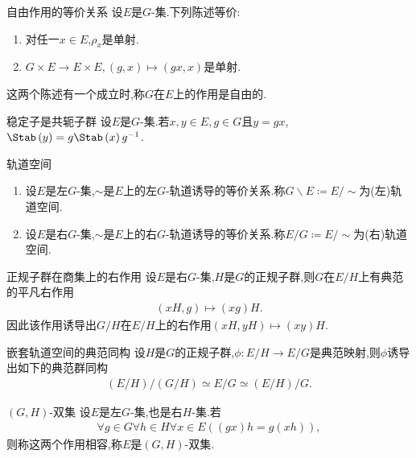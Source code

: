 \begin{proposition}{自由作用的等价关系}{}
	设$E$是$G$-集.下列陈述等价:
	\begin{enumerate}
		\item 对任一$x\in E$,$\rho_{x}$是单射.
		\item $G\times E\to E\times E,\left(g,x\right)\mapsto\left(gx,x\right)$是单射.
	\end{enumerate}
	这两个陈述有一个成立时,称$G$在$E$上的作用是自由的.
\end{proposition}

\begin{proposition}{稳定子是共轭子群}{}
	设$E$是$G$-集.若$x,y\in E,g\in G$且$y=gx$,$\Stab\left(y\right)=g\Stab\left(x\right)g^{-1}$.
\end{proposition}

\begin{definition}{轨道空间}{}
	\begin{enumerate}
		\item 设$E$是左$G$-集,$\sim$是$E$上的左$G$-轨道诱导的等价关系.称$G\backslash E\coloneq E/\sim$为(左)轨道空间.
		\item 设$E$是右$G$-集,$\sim$是$E$上的右$G$-轨道诱导的等价关系.称$E/G\coloneq E/\sim$为(右)轨道空间.
	\end{enumerate}
\end{definition}

\begin{proposition}{正规子群在商集上的右作用}{}
	设$E$是右$G$-集,$H$是$G$的正规子群,则$G$在$E/H$上有典范的平凡右作用
	\begin{align*}
		\left(xH,g\right)\mapsto\left(xg\right)H.
	\end{align*}
	因此该作用诱导出$G/H$在$E/H$上的右作用$\left(xH,yH\right)\mapsto\left(xy\right)H$.
\end{proposition}

\begin{theorem}{嵌套轨道空间的典范同构}{}
	设$H$是$G$的正规子群,$\phi:E/H\to E/G$是典范映射,则$\phi$诱导出如下的典范群同构
	\begin{align*}
		\left(E/H\right)/\left(G/H\right)\simeq E/G\simeq\left(E/H\right)/G.
	\end{align*}
\end{theorem}

\begin{definition}{$\left(G,H\right)$-双集}{}
	设$E$是左$G$-集,也是右$H$-集.若
	\begin{align*}
		\forall g\in G\forall h\in H\forall x\in E\left(\left(gx\right)h=g\left(xh\right)\right),
	\end{align*}
	则称这两个作用相容,称$E$是$\left(G,H\right)$-双集.
\end{definition}

